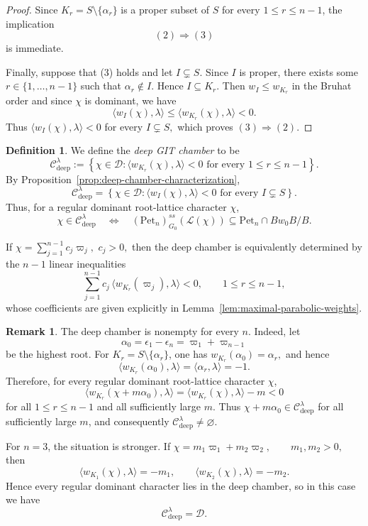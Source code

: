 \documentclass[12pt, reqno]{amsart}
\theoremstyle{plain}
\numberwithin{equation}{section}
\theoremstyle{definition}
\newtheorem{remark}{Remark}
\newtheorem{definition}[theorem]{Definition}
\begin{document}
\begin{proof}
Since $K_r=S\setminus\{\alpha_r\}$ is a proper subset of \(S\) for every \(1\le r\le n-1\), the
implication
\[
(2)\Rightarrow(3)
\]
is immediate.

Finally, suppose that (3) holds and let \(I\subsetneq S\). Since
\(I\) is proper, there exists some \(r\in\{1,\ldots,n-1\}\) such that $\alpha_r\notin I$. Hence $I\subseteq K_r.$ Then $w_I\le w_{K_r}$ in the Bruhat order and since \(\chi\) is dominant, we have  
\[
\langle w_I(\chi),\lambda\rangle
\le
\langle w_{K_r}(\chi),\lambda\rangle
<0.
\]
Thus $\langle w_I(\chi),\lambda\rangle<0$ for every $I\subsetneq S,$
which proves \((3)\Rightarrow(2)\).
\end{proof}

\begin{definition}\label{def:deep-chamber}
We define the \emph{deep GIT chamber} to be 
\[
\mathcal C_{\mathrm{deep}}^\lambda
:=
\left\{
\chi\in\mathcal D:
\langle w_{K_r}(\chi),\lambda\rangle<0
\text{ for every }1\le r\le n-1
\right\}.
\]
By Proposition~\ref{prop:deep-chamber-characterization},
\[
\mathcal C_{\mathrm{deep}}^\lambda
=
\left\{
\chi\in\mathcal D:
\langle w_I(\chi),\lambda\rangle<0
\text{ for every }I\subsetneq S
\right\}.
\]
Thus, for a regular dominant root-lattice character \(\chi\),
\[
\chi\in\mathcal C_{\mathrm{deep}}^\lambda
\quad\Longleftrightarrow\quad
(\mathrm{Pet}_n)^{ss}_{G_0}(\mathcal L(\chi))
\subseteq
\mathrm{Pet}_n\cap Bw_0B/B.
\]
\end{definition}

If $\chi=\sum_{j=1}^{n-1}c_j\varpi_j,
 \,\, c_j>0,$
then the deep chamber is equivalently determined by the \(n-1\)
linear inequalities
\[
\sum_{j=1}^{n-1}
c_j\,
\langle w_{K_r}(\varpi_j),\lambda\rangle<0,
\qquad
1\le r\le n-1,
\]
whose coefficients are given explicitly in
Lemma~\ref{lem:maximal-parabolic-weights}.

\begin{remark}\label{rem:deep-nonempty}
The deep chamber is nonempty for every \(n\). Indeed, let
\[
\alpha_0
=
\epsilon_1-\epsilon_n
=
\varpi_1+\varpi_{n-1}
\]
be the highest root. For \(K_r=S\setminus\{\alpha_r\}\), one has $w_{K_r}(\alpha_0)=\alpha_r,$
and hence
\[
\langle w_{K_r}(\alpha_0),\lambda\rangle
=
\langle\alpha_r,\lambda\rangle
=
-1.
\]
Therefore, for every regular dominant root-lattice character \(\chi\),
\[
\langle
w_{K_r}(\chi+m\alpha_0),\lambda
\rangle
=
\langle w_{K_r}(\chi),\lambda\rangle-m<0
\]
for all \(1\le r\le n-1\) and all sufficiently large \(m\). Thus $\chi+m\alpha_0\in\mathcal C_{\mathrm{deep}}^\lambda$
for all sufficiently large \(m\), and consequently $\mathcal C_{\mathrm{deep}}^\lambda\neq\varnothing.$

For \(n=3\), the situation is stronger. If $\chi=m_1\varpi_1+m_2\varpi_2,
\qquad m_1,m_2>0,$
then
\[
\langle w_{K_1}(\chi),\lambda\rangle=-m_1,
\qquad
\langle w_{K_2}(\chi),\lambda\rangle=-m_2.
\]
Hence every regular dominant character lies in the deep chamber, so in this case we have 
\[
\mathcal C_{\mathrm{deep}}^\lambda=\mathcal D.
\]
\end{remark}
\end{document}
